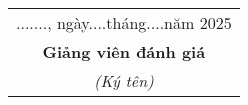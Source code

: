 \begin{evaluationteacher}

\vspace{0.2cm}

\noindent\makebox[\linewidth]{\dotfill}\\[0.5cm]
\noindent\makebox[\linewidth]{\dotfill}\\[0.5cm]
\noindent\makebox[\linewidth]{\dotfill}\\[0.5cm]
\noindent\makebox[\linewidth]{\dotfill}\\[0.5cm]
\noindent\makebox[\linewidth]{\dotfill}\\[0.5cm]
\noindent\makebox[\linewidth]{\dotfill}\\[0.5cm]
\noindent\makebox[\linewidth]{\dotfill}\\[0.5cm]
\noindent\makebox[\linewidth]{\dotfill}\\[0.5cm]
\noindent\makebox[\linewidth]{\dotfill}\\[0.5cm]



\vspace{1cm}

\begin{flushright}
\begin{tabular}{c}
......., ngày....tháng....năm 2025 \\[1em]
\textbf{Giảng viên đánh giá} \\[1em]
\textit{(Ký tên)}
\end{tabular}
\end{flushright}
\end{evaluationteacher}